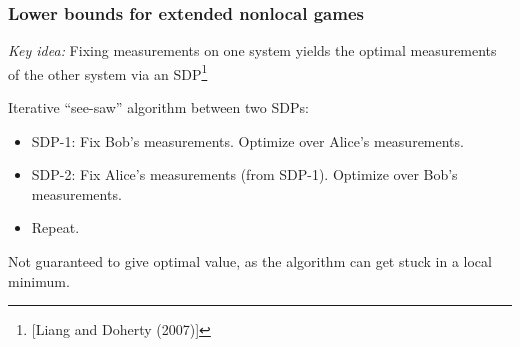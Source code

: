 \documentclass{beamer}
\begin{document}
\begin{frame}[noframenumbering]
	\frametitle{Lower bounds for extended nonlocal games}
	\emph{Key idea:} Fixing measurements on one system yields the optimal measurements of the other system via an SDP\footnote{[Liang and Doherty (2007)]}
	\pause
	\vspace{2mm}
	
	Iterative ``see-saw'' algorithm between two SDPs:
	\begin{itemize}
			\item SDP-1: Fix Bob's measurements. Optimize over Alice's measurements. 
			\item SDP-2: Fix Alice's measurements (from SDP-1). Optimize over Bob's measurements. 
			\item Repeat. 
	\end{itemize}

	Not guaranteed to give optimal value, as the algorithm can get stuck in a local minimum. 	
	
\end{frame}  
  
\end{document}
